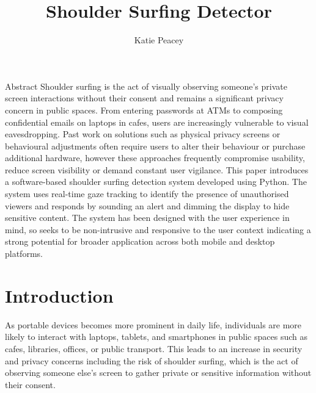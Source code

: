 \documentclass[12pt]{article}
\title{ Shoulder Surfing Detector}
\author{Katie Peacey}
\theoremstyle{plain}
\theoremstyle{definition}
\begin{document}

\maketitle
\studentdeclarations

\begin{frontmatterparagraph}{Abstract}
Shoulder surfing is the act of visually observing someone’s private screen interactions without their consent and remains a significant privacy concern in public spaces. From entering passwords at ATMs to composing confidential emails on laptops in cafes, users are increasingly vulnerable to visual eavesdropping. Past work on solutions such as physical privacy screens or behavioural adjustments often require users to alter their behaviour or purchase additional hardware, however these approaches frequently compromise usability, reduce screen visibility or demand constant user vigilance. This paper introduces a software-based shoulder surfing detection system developed using Python. The system uses real-time gaze tracking to identify the presence of unauthorised viewers and responds by sounding an alert and dimming the display to hide sensitive content. The system has been designed  with the user experience in mind, so seeks to be non-intrusive and responsive to the user context indicating a strong potential for broader application across both mobile and desktop platforms.
\end{frontmatterparagraph}

\tableofcontents

\listoffigures
\listoftables
\clearpage


\section{Introduction}
\label{sec:intro}

As portable devices becomes more prominent in daily life, individuals are more likely to interact with laptops, tablets, and smartphones in public spaces such as cafes, libraries, offices, or public transport. This leads to an increase in security and privacy concerns including the risk of shoulder surfing, which is the act of observing someone else’s screen to gather private or sensitive information without their consent.
\end{document}
